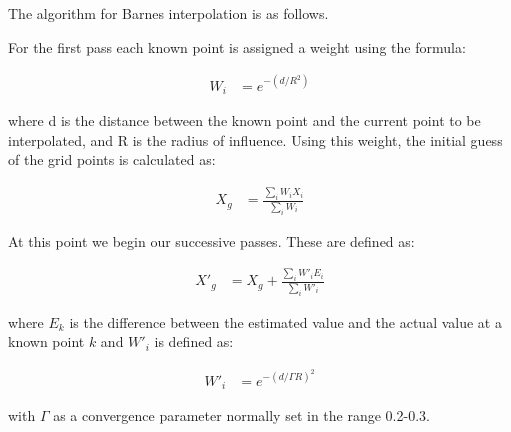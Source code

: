             The algorithm for Barnes interpolation is as follows.

            For the first pass each known point is assigned a weight using the formula: 

            \begin{align*}
                W_{i} &= e^{-(d/R^{2})}
            \end{align*}
            
            where d is the distance between the known point and the current point to be interpolated, and R is the radius of influence. Using this weight, the initial guess of the grid points is calculated as: 
            
            \begin{align*}
                X_{g} &= \frac{\sum_{i}{W_{i}X_{i}}}{\sum_{i}{W_{i}}}
            \end{align*}

            At this point we begin our successive passes. These are defined as:

            \begin{align*}
                X'_{g} &= X_{g} + \frac{\sum_{i}{W'_{i}E_{i}}}{\sum_{i}{W'_{i}}}
            \end{align*}

            where $E_{k}$ is the difference between the estimated value and the actual value at a known point $k$ and $W'_{i}$ is defined as:

            \begin{align*}
                W'_{i} &= e^{-(d/\Gamma R)^{2}}
            \end{align*}

            with $\Gamma$ as a convergence parameter normally set in the range 0.2-0.3.


